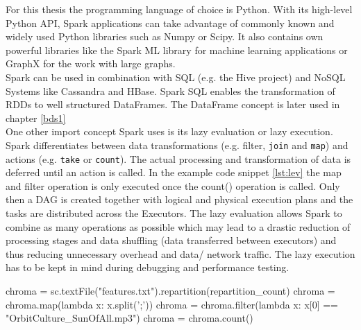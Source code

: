 For this thesis the programming language of choice is Python. With its high-level  Python API, Spark applications can take advantage of commonly known and widely used Python libraries such as Numpy or Scipy. It also contains own powerful libraries like the Spark ML library for machine learning applications or GraphX for the work with large graphs.\\ 
Spark can be used in combination with SQL (e.g. the Hive project) and NoSQL Systems like Cassandra and HBase. Spark SQL enables the transformation of RDDs to well structured DataFrames. The DataFrame concept is later used in chapter \ref{bds1}\\
One other import concept Spark uses is its lazy evaluation or lazy execution. Spark differentiates between data transformations (e.g. filter, \lstinline{join} and \lstinline{map}) and actions (e.g. \lstinline{take} or \lstinline{count}). The actual processing and transformation of data is deferred until an action is called. In the example code snippet \ref{lst:lev} the map and filter operation is only executed once the count() operation is called. Only then a DAG is created together with logical and physical execution plans and the tasks are distributed across the Executors. The lazy evaluation allows Spark to combine as many operations as possible which may lead to a drastic reduction of processing stages and data shuffling (data transferred between executors) and thus reducing unnecessary overhead and data/ network traffic. The lazy execution has to be kept in mind during debugging and performance testing. \cite[p.73]{sparkbook1}

\begin{pythonCode}[frame=single,label={lst:lev},caption={lazy evaluation},captionpos=b]
chroma = sc.textFile("features.txt").repartition(repartition_count)
chroma = chroma.map(lambda x: x.split(';'))
chroma = chroma.filter(lambda x: x[0] == "OrbitCulture_SunOfAll.mp3")
chroma = chroma.count()
\end{pythonCode}

